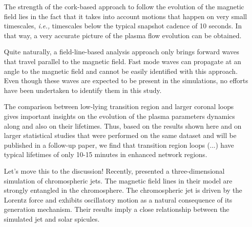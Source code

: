 \documentclass{aa}
\begin{document}
{{\color{blue}The strength of the cork-based approach to follow the evolution of the magnetic field lies in the fact that it takes into account motions that happen on very small timescales, {\emph{i.e.,}} timescales below the typical snapshot cadence of 10 seconds. In that way, a very accurate picture of the plasma flow evolution can be obtained. }


Quite naturally, a field-line-based analysis approach only brings forward waves that travel parallel to the magnetic field. Fast mode waves can propagate at an angle to the magnetic field and cannot be easily identified with this approach. Even though these waves are expected to be present in the simulations, no efforts have been undertaken to identify them in this study. 

The comparison between low-lying transition region and larger coronal loops gives important insights on the evolution of the plasma parameters dynamics along   and also on their lifetimes. Thus, based on the results shown here and on larger statistical studies that were performed on the same dataset and will be published in a follow-up paper, we find that transition region loops (...) have typical lifetimes of only 10-15 minutes in enhanced network regions.  


{\color{blue} Let's move this to the discussion!}
Recently, \cite{iijima+yokoyama:2017} presented a three-dimensional simulation of chromospheric jets. %
The magnetic field lines in their model are strongly entangled in the
chromosphere. The chromospheric jet is driven by the Lorentz force and exhibits oscillatory
motion as a natural consequence of its generation mechanism. %
Their results imply a close relationship between the simulated jet and solar spicules.

}
\end{document}
